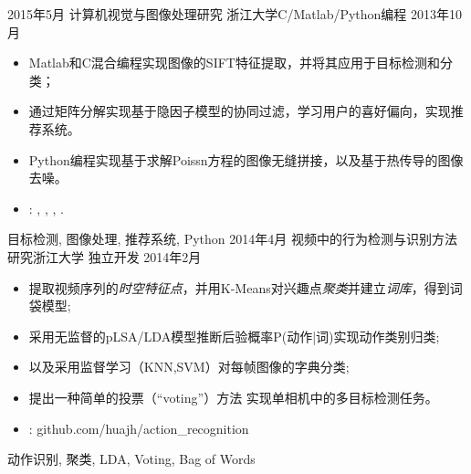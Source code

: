 %
%


 
\begin{experiences}
			
 \experience
    {2015年5月}   {计算机视觉与图像处理研究}{ 浙江大学}{C/Matlab/Python编程}
    {2013年10月} {
                      \begin{itemize}
                        \item Matlab和C混合编程实现图像的SIFT特征提取，并将其应用于目标检测和分类；
                        \item 通过矩阵分解实现基于隐因子模型的协同过滤，学习用户的喜好偏向，实现推荐系统。
                        \item Python编程实现基于求解Poissn方程的图像无缝拼接，以及基于热传导的图像去噪。
                        \item \faGithub: 
                        , 
                        ,
                        ,
                        .                                                                                       
                      \end{itemize}
                    }
                    {目标检测, 图像处理, 推荐系统, Python}
  \emptySeparator
  \experience
    { 2014年4月} {视频中的行为检测与识别方法研究}{浙江大学}{ 独立开发}
    {2014年2月}    {
                      \begin{itemize}
                        \item 提取视频序列的\emph{时空特征点}，并用K-Means对兴趣点\emph{聚类}并建立\emph{词库}，得到词袋模型; 
                        \item 采用无监督的pLSA/LDA模型推断后验概率P(动作|词)实现动作类别归类;
                        \item 以及采用监督学习（KNN,SVM）对每帧图像的字典分类;                    
                        \item 提出一种简单的投票（``voting''）方法 实现单相机中的多目标检测任务。
                        \item \faGithub:  {github.com/huajh/action\_recognition}                                                                                          
                      \end{itemize}
                    }
                    {动作识别, 聚类, LDA, Voting, Bag of Words}
	
  \emptySeparator
\end{experiences}
